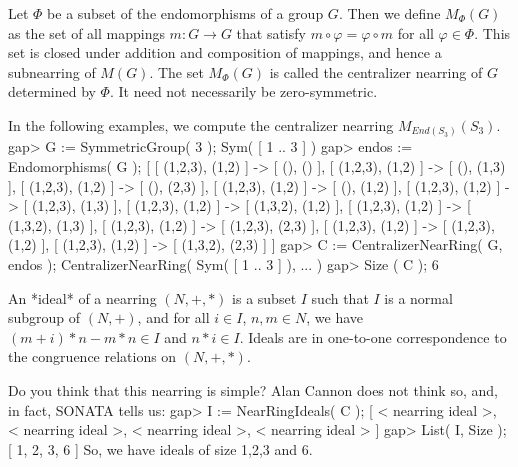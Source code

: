 Let $\Phi$ be a subset of the endomorphisms of a group $G$.
Then we define $M_{\Phi} (G)$ as the set of all
mappings $m : G \to G$ that satisfy $m \circ \varphi =
\varphi \circ m$ for all $\varphi \in \Phi$.
This set is closed under addition and composition of
mappings, and hence a subnearring of $M(G)$.
The set $M_{\Phi} (G)$ is called the centralizer nearring
of $G$ determined by $\Phi$. It need not necessarily be
zero-symmetric.

In the following examples, we compute the centralizer nearring
$M_{End (S_3)} (S_3)$.
\beginexample
    gap> G := SymmetricGroup( 3 );
    Sym( [ 1 .. 3 ] )
    gap> endos := Endomorphisms( G );
    [ [ (1,2,3), (1,2) ] -> [ (), () ], [ (1,2,3), (1,2) ] -> [ (), (1,3) ],
      [ (1,2,3), (1,2) ] -> [ (), (2,3) ], [ (1,2,3), (1,2) ] -> [ (), (1,2) ],
      [ (1,2,3), (1,2) ] -> [ (1,2,3), (1,3) ],
      [ (1,2,3), (1,2) ] -> [ (1,3,2), (1,2) ],
      [ (1,2,3), (1,2) ] -> [ (1,3,2), (1,3) ],
      [ (1,2,3), (1,2) ] -> [ (1,2,3), (2,3) ],
      [ (1,2,3), (1,2) ] -> [ (1,2,3), (1,2) ],
      [ (1,2,3), (1,2) ] -> [ (1,3,2), (2,3) ] ]
    gap> C := CentralizerNearRing( G, endos );
    CentralizerNearRing( Sym( [ 1 .. 3 ] ), ... )
    gap> Size ( C );
    6
\endexample

An *ideal* of a nearring $(N,+,*)$ is a subset $I$ such that
$I$ is a normal subgroup of $(N,+)$, and
for all $i \in I$, $n,m \in N$, we have
$(m+i)*n - m*n \in I$ and $n*i \in I$. Ideals are in
one-to-one correspondence to the congruence relations
on $(N,+,*)$.


Do you think that this nearring is simple? Alan Cannon does not think so,
and, in fact, SONATA tells us:
\beginexample
    gap> I := NearRingIdeals( C );
    [ < nearring ideal >, < nearring ideal >, < nearring ideal >, 
      < nearring ideal > ]
    gap> List( I, Size );
    [ 1, 2, 3, 6 ]
\endexample 
So, we have ideals of size 1,2,3 and 6.



